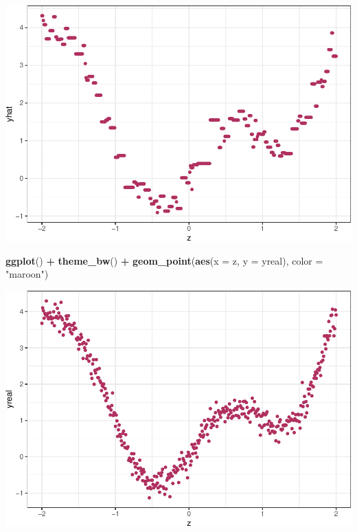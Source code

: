 \documentclass[]{article}
\newenvironment{Shaded}{\begin{snugshade}}{\end{snugshade}}
\newcommand{\KeywordTok}[1]{\textcolor[rgb]{0.13,0.29,0.53}{\textbf{#1}}}
\newcommand{\DataTypeTok}[1]{\textcolor[rgb]{0.13,0.29,0.53}{#1}}
\newcommand{\StringTok}[1]{\textcolor[rgb]{0.31,0.60,0.02}{#1}}
\newcommand{\OperatorTok}[1]{\textcolor[rgb]{0.81,0.36,0.00}{\textbf{#1}}}
\newcommand{\NormalTok}[1]{#1}
\begin{document}
\includegraphics{hw7_files/figure-latex/unnamed-chunk-2-1.pdf}

\begin{Shaded}
\begin{Highlighting}[]
\KeywordTok{ggplot}\NormalTok{() }\OperatorTok{+}\StringTok{ }\KeywordTok{theme_bw}\NormalTok{() }\OperatorTok{+}
\StringTok{  }\KeywordTok{geom_point}\NormalTok{(}\KeywordTok{aes}\NormalTok{(}\DataTypeTok{x =}\NormalTok{ z, }\DataTypeTok{y =}\NormalTok{ yreal), }\DataTypeTok{color =} \StringTok{"maroon"}\NormalTok{)}
\end{Highlighting}
\end{Shaded}

\includegraphics{hw7_files/figure-latex/unnamed-chunk-2-2.pdf}
\end{document}
